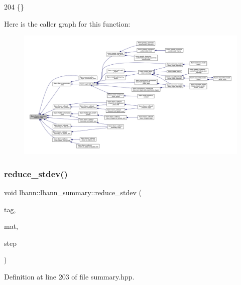 \begin{DoxyCode}
204 \{\}
\end{DoxyCode}
Here is the caller graph for this function\+:\nopagebreak
\begin{figure}[H]
\begin{center}
\leavevmode
\includegraphics[width=350pt]{classlbann_1_1lbann__summary_a3e0b9aae1f80403a195567fd25ea2525_icgraph}
\end{center}
\end{figure}
\mbox{\label{classlbann_1_1lbann__summary_a65475f9a72f042b6ba09a2d33fda9293}} 
\subsubsection{\texorpdfstring{reduce\+\_\+stdev()}{reduce\_stdev()}}
{\footnotesize\ttfamily void lbann\+::lbann\+\_\+summary\+::reduce\+\_\+stdev (\begin{DoxyParamCaption}\item[{const std\+::string}]{tag,  }\item[{const \hyperlink{base_8hpp_a9a697a504ae84010e7439ffec862b470}{Abs\+Dist\+Mat} \&}]{mat,  }\item[{int}]{step }\end{DoxyParamCaption})\hspace{0.3cm}{\ttfamily [inline]}}



Definition at line 203 of file summary.\+hpp.


